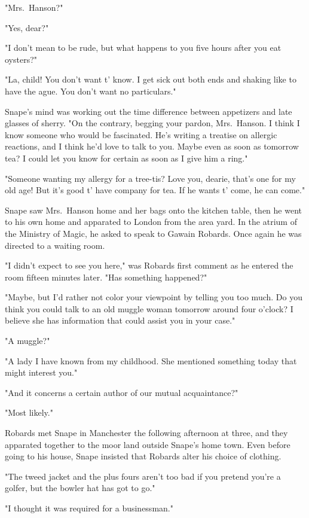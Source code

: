 "Mrs.~Hanson?"

"Yes, dear?"

"I don't mean to be rude, but what happens to you five hours after you eat oysters?"

"La, child! You don't want t' know. I get sick out both ends and shaking like to have the ague. You don't want no particulars."

Snape's mind was working out the time difference between appetizers and late glasses of sherry. "On the contrary, begging your pardon, Mrs.~Hanson. I think I know someone who would be fascinated. He's writing a treatise on allergic reactions, and I think he'd love to talk to you. Maybe even as soon as tomorrow tea? I could let you know for certain as soon as I give him a ring."

"Someone wanting my allergy for a tree-tis? Love you, dearie, that's one for my old age! But it's good t' have company for tea. If he wants t' come, he can come."

Snape saw Mrs.~Hanson home and her bags onto the kitchen table, then he went to his own home and apparated to London from the area yard. In the atrium of the Ministry of Magic, he asked to speak to Gawain Robards. Once again he was directed to a waiting room.

"I didn't expect to see you here," was Robards first comment as he entered the room fifteen minutes later. "Has something happened?"

"Maybe, but I'd rather not color your viewpoint by telling you too much. Do you think you could talk to an old muggle woman tomorrow around four o'clock? I believe she has information that could assist you in your case."

"A muggle?"

"A lady I have known from my childhood. She mentioned something today that might interest you."

"And it concerns a certain author of our mutual acquaintance?"

"Most likely."

Robards met Snape in Manchester the following afternoon at three, and they apparated together to the moor land outside Snape's home town. Even before going to his house, Snape insisted that Robards alter his choice of clothing.

"The tweed jacket and the plus fours aren't too bad if you pretend you're a golfer, but the bowler hat has got to go."

"I thought it was required for a businessman."

